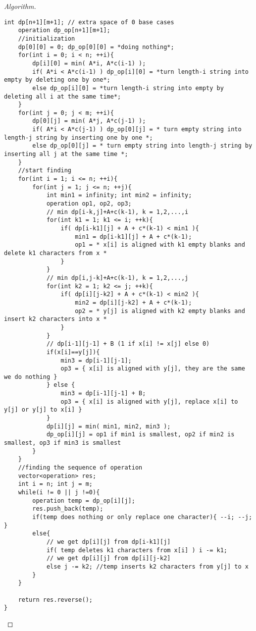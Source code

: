 \documentclass[openany]{article}
\begin{document}
\begin{proof}[Algorithm]{}
\begin{lstlisting}[basicstyle=\fontsize{8}{9}\selectfont\ttfamily]
    int dp[n+1][m+1]; // extra space of 0 base cases
    operation dp_op[n+1][m+1];
    //initialization
    dp[0][0] = 0; dp_op[0][0] = *doing nothing*;
    for(int i = 0; i < n; ++i){
        dp[i][0] = min( A*i, A*c(i-1) );
        if( A*i < A*c(i-1) ) dp_op[i][0] = *turn length-i string into empty by deleting one by one*;
        else dp_op[i][0] = *turn length-i string into empty by deleting all i at the same time*;
    }
    for(int j = 0; j < m; ++i){
        dp[0][j] = min( A*j, A*c(j-1) );
        if( A*i < A*c(j-1) ) dp_op[0][j] = * turn empty string into length-j string by inserting one by one *;
        else dp_op[0][j] = * turn empty string into length-j string by inserting all j at the same time *;
    }
    //start finding
    for(int i = 1; i <= n; ++i){
        for(int j = 1; j <= n; ++j){
            int min1 = infinity; int min2 = infinity;
            operation op1, op2, op3;
            // min dp[i-k,j]+A+c(k-1), k = 1,2,...,i
            for(int k1 = 1; k1 <= i; ++k){
                if( dp[i-k1][j] + A + c*(k-1) < min1 ){
                    min1 = dp[i-k1][j] + A + c*(k-1);
                    op1 = * x[i] is aligned with k1 empty blanks and delete k1 characters from x *
                }
            }
            // min dp[i,j-k]+A+c(k-1), k = 1,2,...,j
            for(int k2 = 1; k2 <= j; ++k){
                if( dp[i][j-k2] + A + c*(k-1) < min2 ){
                    min2 = dp[i][j-k2] + A + c*(k-1);
                    op2 = * y[j] is aligned with k2 empty blanks and insert k2 characters into x *
                }
            }
            // dp[i-1][j-1] + B (1 if x[i] != x[j] else 0)
            if(x[i]==y[j]){
                min3 = dp[i-1][j-1];
                op3 = { x[i] is aligned with y[j], they are the same we do nothing }
            } else {
                min3 = dp[i-1][j-1] + B;
                op3 = { x[i] is aligned with y[j], replace x[i] to y[j] or y[j] to x[i] }
            }
            dp[i][j] = min( min1, min2, min3 );
            dp_op[i][j] = op1 if min1 is smallest, op2 if min2 is smallest, op3 if min3 is smallest
        }
    }
    //finding the sequence of operation
    vector<operation> res;
    int i = n; int j = m;
    while(i != 0 || j !=0){
        operation temp = dp_op[i][j];
        res.push_back(temp);
        if(temp does nothing or only replace one character){ --i; --j; }
        else{
            // we get dp[i][j] from dp[i-k1][j]
            if( temp deletes k1 characters from x[i] ) i -= k1;
            // we get dp[i][j] from dp[i][j-k2]
            else j -= k2; //temp inserts k2 characters from y[j] to x
        }
    }
    
    return res.reverse();
}
		\end{lstlisting} 
\end{proof}
\end{document}
